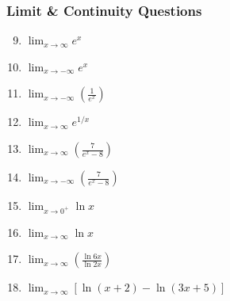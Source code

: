 \documentclass[12pt]{article}
\newif\ifans
\begin{document}
\subsubsection*{Limit \& Continuity Questions}


\begin{enumerate}
\setcounter{enumi}{8}

\item  $\displaystyle \lim_{x\rightarrow \infty}{e^{x}}$ 

\ifans{\fbox{$+\infty$}} \fi

\item  $\displaystyle \lim_{x\rightarrow -\infty}{e^x}$ 

\ifans{\fbox{0}} \fi

\item  $\displaystyle \lim_{x\rightarrow -\infty}{\left(\frac{1}{e^x}\right)}$ 

\ifans{\fbox{$+\infty$}} \fi

\item  $\displaystyle \lim_{x\rightarrow \infty} e^{1/x}$ 

\ifans{\fbox{1}} \fi

\item $\displaystyle \lim_{x \rightarrow \infty}{\left(\frac{7}{e^x-8}\right)}$

\ifans{\fbox{0}} \fi

\item $\displaystyle \lim_{x \rightarrow -\infty}{\left(\frac{7}{e^x-8}\right)}$

\ifans{\fbox{$\displaystyle -\frac{7}{8}$}} \fi

\item $\displaystyle \lim_{x\rightarrow 0^+}{\ln{x}}$ 

\ifans{\fbox{$-\infty$}} \fi

\item  $\displaystyle \lim_{x\rightarrow \infty}{\ln{x}}$ 

\ifans{\fbox{$+\infty$}} \fi

\item $\displaystyle \lim_{x\rightarrow \infty}{\left(\frac{\ln{6x}}{\ln{2x}}\right)}$

\ifans{\fbox{1}} \fi

\item $\displaystyle \lim_{x\rightarrow \infty}{\left[\ln{(x+2)}-\ln{(3x+5)}\right]}$

\ifans{\fbox{$\displaystyle \ln{\left(\frac{1}{3}\right)}$}} \fi

\end{enumerate}
\end{document}

